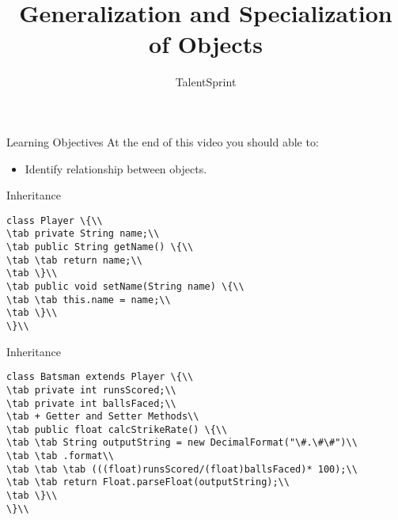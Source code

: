\documentclass[aspectratio=169,14pt,usenames,dvipsnames]{beamer}
\title[Generalization and Specialization of Objects]{Generalization and
Specialization of Objects}
\newcommand\tab[1][1cm]{\hspace*{#1}}
\begin{document}
{\1
\begin{frame} \vspace{35pt}

\subtitle{TalentSprint}
\maketitle
\end{frame}
}

\begin{frame}{Learning Objectives}
At the end of this video you should able to:
\begin{itemize}
\item Identify relationship between objects.
\end{itemize}
\end{frame}

\begin{frame}{Inheritance}
\begin{lstlisting}
class Player \{\\
\tab private String name;\\
\tab public String getName() \{\\
\tab \tab return name;\\
\tab \}\\
\tab public void setName(String name) \{\\
\tab \tab this.name = name;\\
\tab \}\\
\}\\
\end{lstlisting}
\end{frame}

\begin{frame}{Inheritance}
\begin{lstlisting}
class Batsman extends Player \{\\
\tab private int runsScored;\\
\tab private int ballsFaced;\\
\tab + Getter and Setter Methods\\
\tab public float calcStrikeRate() \{\\
\tab \tab String outputString = new DecimalFormat("\#.\#\#")\\
\tab \tab .format\\
\tab \tab \tab (((float)runsScored/(float)ballsFaced)* 100);\\
\tab \tab return Float.parseFloat(outputString);\\
\tab \}\\
\}\\
\end{lstlisting}
\end{frame}
\end{document}
